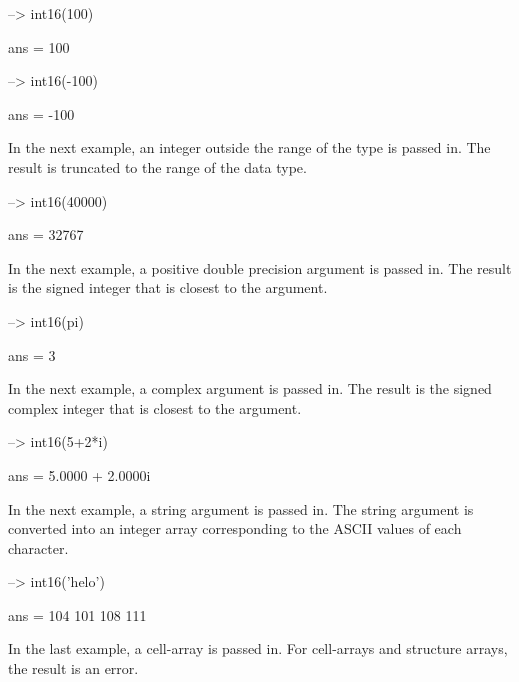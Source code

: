 \begin{DoxyVerbInclude}
--> int16(100)

ans = 
 100 

--> int16(-100)

ans = 
 -100 
\end{DoxyVerbInclude}


In the next example, an integer outside the range of the type is passed in. The result is truncated to the range of the data type.


\begin{DoxyVerbInclude}
--> int16(40000)

ans = 
 32767 
\end{DoxyVerbInclude}


In the next example, a positive double precision argument is passed in. The result is the signed integer that is closest to the argument.


\begin{DoxyVerbInclude}
--> int16(pi)

ans = 
 3 
\end{DoxyVerbInclude}


In the next example, a complex argument is passed in. The result is the signed complex integer that is closest to the argument.


\begin{DoxyVerbInclude}
--> int16(5+2*i)

ans = 
   5.0000 +  2.0000i 
\end{DoxyVerbInclude}


In the next example, a string argument is passed in. The string argument is converted into an integer array corresponding to the A\-S\-C\-I\-I values of each character.


\begin{DoxyVerbInclude}
--> int16('helo')

ans = 
 104 101 108 111 
\end{DoxyVerbInclude}


In the last example, a cell-\/array is passed in. For cell-\/arrays and structure arrays, the result is an error.


